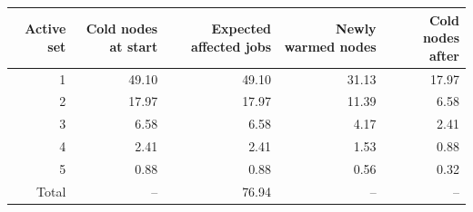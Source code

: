 \begin{tabular}{rrrrr}
\toprule
Active set & Cold nodes at start & Expected affected jobs & Newly warmed nodes & Cold nodes after \\
\midrule
1 & 49.10 & 49.10 & 31.13 & 17.97 \\
2 & 17.97 & 17.97 & 11.39 & 6.58 \\
3 & 6.58 & 6.58 & 4.17 & 2.41 \\
4 & 2.41 & 2.41 & 1.53 & 0.88 \\
5 & 0.88 & 0.88 & 0.56 & 0.32 \\
\midrule
Total & -- & 76.94 & -- & -- \\
\bottomrule
\end{tabular}
